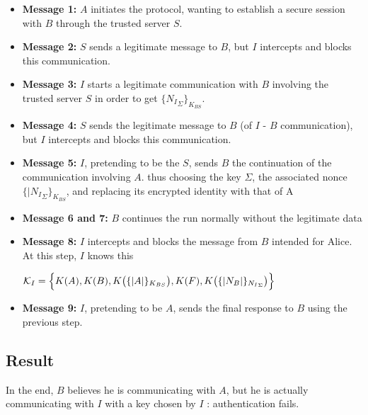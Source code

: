 \documentclass[11pt]{article}
\begin{document}
    \begin{itemize}
        \item \textbf{Message 1:} $A$ initiates the protocol, wanting to establish a secure session with $B$ through
        the trusted server $S$.

        \item \textbf{Message 2:} $S$ sends a legitimate message to $B$, but $I$ intercepts and blocks this communication.


        \item \textbf{Message 3:} $I$ starts a legitimate communication with $B$ involving the trusted server $S$ in
         order to get $\{{N_I}_{\Sigma}\}_{K_{BS}}$.




        \item \textbf{Message 4:} $S$ sends the legitimate message to $B$ (of $I$ - $B$ communication), but $I$ intercepts and blocks this communication.

        \item \textbf{Message 5:} $I$, pretending to be the $S$, sends $B$ the continuation of the communication involving $A$.
        thus choosing the key $\Sigma$, the associated nonce $\{|{N_I}_{\Sigma}\}_{K_{BS}}$, and replacing its encrypted identity with that of A

        \item \textbf{Message 6 and 7:} $B$ continues the run normally without the legitimate data


        \item \textbf{Message 8:} $I$ intercepts and blocks the message from $B$ intended for Alice. At this step, $I$ knows this
        \begin{center}
            $\mathcal{K}_I = \Bigl\{ K(A), K(B), K\bigl(\{|A|\}_{K_{BS}}\bigr), K(F),  K\bigl(\{|N_B|\}_{{N_I}_{\Sigma}}\bigr) \Bigr\}$
        \end{center}

        \item \textbf{Message 9:} $I$, pretending to be $A$, sends the final response to $B$ using the previous step.



    \end{itemize}

    \subsection{Result}

    In the end, $B$ believes he is communicating with $A$, but he is actually communicating with $I$ with a key chosen by $I$ : authentication fails.
\end{document}
